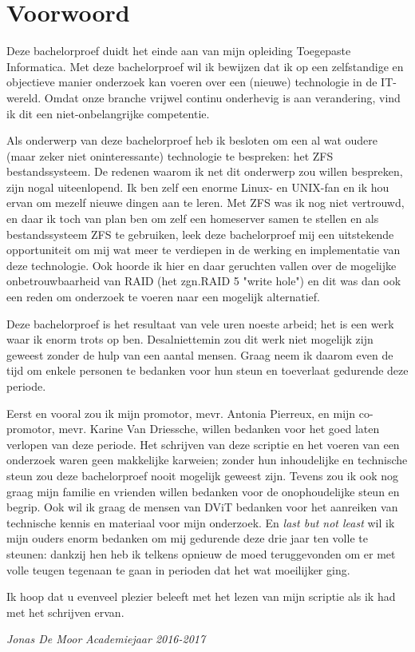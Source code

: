 
\chapter*{Voorwoord}
\label{ch:voorwoord}


Deze bachelorproef duidt het einde aan van mijn opleiding Toegepaste Informatica. Met deze bachelorproef wil ik bewijzen dat ik op een zelfstandige en objectieve manier onderzoek kan voeren over een (nieuwe) technologie in de IT-wereld. Omdat onze branche vrijwel continu onderhevig is aan verandering, vind ik dit een niet-onbelangrijke competentie. 

Als onderwerp van deze bachelorproef heb ik besloten om een al wat oudere (maar zeker niet oninteressante) technologie te bespreken: het ZFS bestandssysteem. De redenen waarom ik net dit onderwerp zou willen bespreken, zijn nogal uiteenlopend. Ik ben zelf een enorme Linux- en UNIX-fan en ik hou ervan om mezelf nieuwe dingen aan te leren. Met ZFS was ik nog niet vertrouwd, en daar ik toch van plan ben om zelf een homeserver samen te stellen en als bestandssysteem ZFS te gebruiken, leek deze bachelorproef mij een uitstekende opportuniteit om mij wat meer te verdiepen in de werking en implementatie van deze technologie. Ook hoorde ik hier en daar geruchten vallen over de mogelijke onbetrouwbaarheid van RAID (het zgn.RAID 5 "write hole") en dit was dan ook een reden om onderzoek te voeren naar een mogelijk alternatief.

Deze bachelorproef is het resultaat van vele uren noeste arbeid; het is een werk waar ik enorm trots op ben. Desalniettemin zou dit werk niet mogelijk zijn geweest zonder de hulp van een aantal mensen. Graag neem ik daarom even de tijd om enkele personen te bedanken voor hun steun en toeverlaat gedurende deze periode. 

Eerst en vooral zou ik mijn promotor, mevr. Antonia Pierreux, en mijn co-promotor, mevr. Karine Van Driessche, willen bedanken voor het goed laten verlopen van deze periode. Het schrijven van deze scriptie en het voeren van een onderzoek waren geen makkelijke karweien; zonder hun inhoudelijke en technische steun zou deze bachelorproef nooit mogelijk geweest zijn. Tevens zou ik ook nog graag mijn familie en vrienden willen bedanken voor de onophoudelijke steun en begrip. Ook wil ik graag de mensen van DViT bedanken voor het aanreiken van technische kennis en materiaal voor mijn onderzoek. En \textit{last but not least} wil ik mijn ouders enorm bedanken om mij gedurende deze drie jaar ten volle te steunen: dankzij hen heb ik telkens opnieuw de moed teruggevonden om er met volle teugen tegenaan te gaan in perioden dat het wat moeilijker ging.

Ik hoop dat u evenveel plezier beleeft met het lezen van mijn scriptie als ik had met het schrijven ervan.

\begin{flushright}
  \textit{Jonas De Moor}
  \textit{Academiejaar 2016-2017}
\end{flushright}
